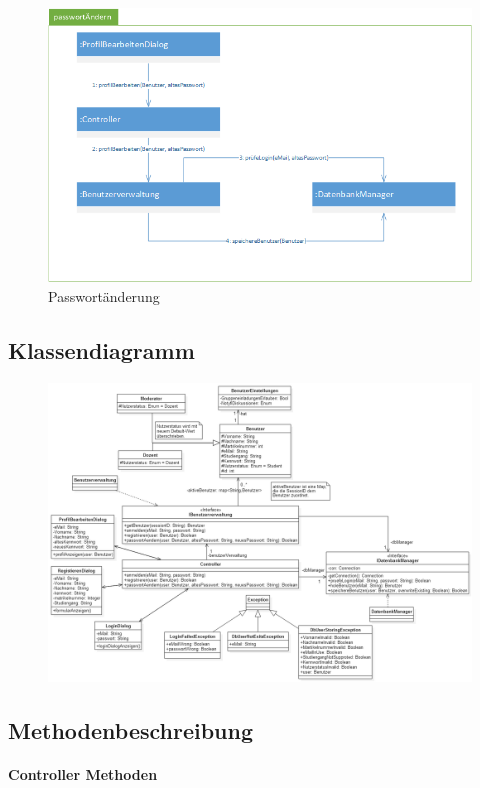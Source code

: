 \documentclass[12pt,a4paper]{article}
\begin{document}
\begin{figure}[H]
\centering
\includegraphics[width=0.7\linewidth]{Bilder/Kommunikationsdiagramme/passwortAendern}
\caption{Passwortänderung}
\label{Passwortaenderung}
\end{figure}


\subsection{Klassendiagramm}

\begin{figure}[H]
\centering
\includegraphics[width=\textwidth]{Bilder/Klassendiagramm/Klassendiagramm}
\caption{}
\label{fig:Klassendiagramm}
\end{figure}


\subsection{Methodenbeschreibung}


\paragraph{Controller Methoden}\mbox{}\\
\end{document}
